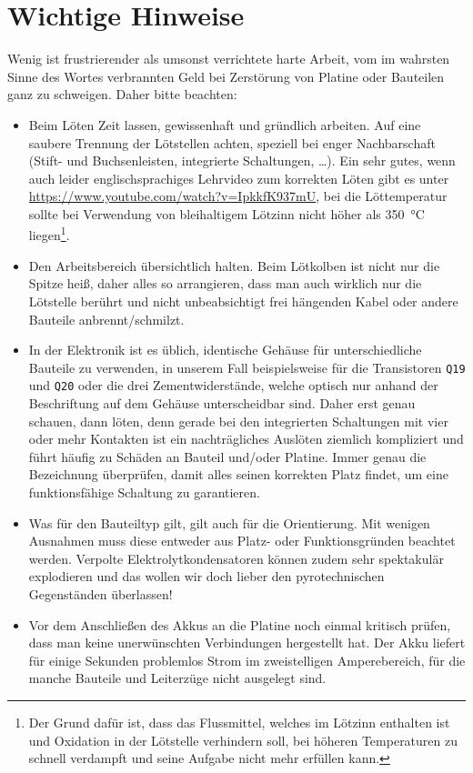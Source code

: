 \documentclass[paper=a4, open=any]{scrbook}
\begin{document}
		\section{Wichtige Hinweise}
			Wenig ist frustrierender als umsonst verrichtete harte Arbeit, vom im wahrsten Sinne des Wortes verbrannten Geld bei Zerstörung von Platine oder Bauteilen ganz zu schweigen. Daher bitte beachten:
			\begin{itemize}
				\item Beim Löten Zeit lassen, gewissenhaft und gründlich arbeiten. Auf eine saubere Trennung der Lötstellen achten, speziell bei enger Nachbarschaft (Stift- und Buchsenleisten, integrierte Schaltungen, \dots). Ein sehr gutes, wenn auch leider englischsprachiges Lehrvideo zum korrekten Löten gibt es unter \url{https://www.youtube.com/watch?v=IpkkfK937mU}, bei die Löttemperatur sollte bei Verwendung von bleihaltigem Lötzinn nicht höher als \SI{350}{\degreeCelsius} liegen\footnote{Der Grund dafür ist, dass das Flussmittel, welches im Lötzinn enthalten ist und Oxidation in der Lötstelle verhindern soll, bei höheren Temperaturen zu schnell verdampft und seine Aufgabe nicht mehr erfüllen kann.}.
				\item Den Arbeitsbereich übersichtlich halten. Beim Lötkolben ist nicht nur die Spitze heiß, daher alles so arrangieren, dass man auch wirklich nur die Lötstelle berührt und nicht unbeabsichtigt frei hängenden Kabel oder andere Bauteile anbrennt/schmilzt.
				\item In der Elektronik ist es üblich, identische Gehäuse für unterschiedliche Bauteile zu verwenden, in unserem Fall beispielsweise für die Transistoren \texttt{Q19} und \texttt{Q20} oder die drei Zementwiderstände, welche optisch nur anhand der Beschriftung auf dem Gehäuse unterscheidbar sind. Daher erst genau schauen, dann löten, denn gerade bei den integrierten Schaltungen mit vier oder mehr Kontakten ist ein nachträgliches Auslöten ziemlich kompliziert und führt häufig zu Schäden an Bauteil und/oder Platine. Immer genau die Bezeichnung überprüfen, damit alles seinen korrekten Platz findet, um eine funktionsfähige Schaltung zu garantieren.
				\item Was für den Bauteiltyp gilt, gilt auch für die Orientierung. Mit wenigen Ausnahmen muss diese entweder aus Platz- oder Funktionsgründen beachtet werden. Verpolte Elektrolytkondensatoren können zudem sehr spektakulär explodieren und das wollen wir doch lieber den pyrotechnischen Gegenständen überlassen!
				\item Vor dem Anschließen des Akkus an die Platine noch einmal kritisch prüfen, dass man keine unerwünschten Verbindungen hergestellt hat. Der Akku liefert für einige Sekunden problemlos Strom im zweistelligen Amperebereich, für die manche Bauteile und Leiterzüge nicht ausgelegt sind.
			\end{itemize}
	
\end{document}
